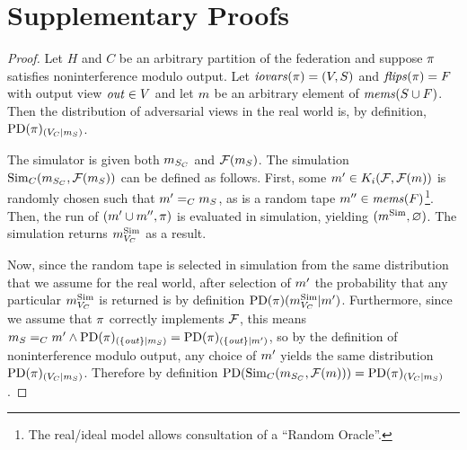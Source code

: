 \section{Supplementary Proofs}
\label{section-proofs}

\nimosecure*

\begin{proof}
  Let $H$ and $C$ be an arbitrary partition of the federation and
  suppose $\pi$ satisfies noninterference modulo output. Let
  $\mathit{iovars}(\pi) = (V,S)$ and $\mathit{flips}(\pi) = F$ with output view $\mathit{out}
  \in V$ and let $m$ be an arbitrary element of $\mathit{mems}(S \cup
  F)$. Then the distribution of adversarial views in the real world
  is, by definition,
  $\mathrm{PD}(\pi)_{({V_C}|{m_S})}$.

  The simulator is given both $m_{S_C}$ and
  $\mathcal{F}(m_S)$.  The simulation $\mathrm{Sim}_C(m_{S_C},
  \mathcal{F}(m_S))$ can be defined as follows. First, some $m'
  \in K_i(\mathcal{F},\mathcal{F}(m))$ is randomly chosen such that
  $m' =_C m_S$, as is a random tape $m'' \in
  \mathit{mems}(F)$\footnote{The real/ideal model allows consultation of a
  ``Random Oracle''.}. Then, the run of $(m' \cup m'',
  \pi)$ is evaluated in simulation, yielding $(m^{\mathrm{Sim}},\varnothing)$.
  The simulation returns $m^{\mathrm{Sim}}_{V_C}$ as a result.

  Now, since the random tape is selected in simulation from the same distribution
  that we assume for the real world, after selection of $m'$ the
  probability that any particular $m^{\mathrm{Sim}}_{V_C}$ is returned is by definition
  $
  \mathrm{PD}(\pi)(m^{\mathrm{Sim}}_{V_C} | m')
  $.
  Furthermore, since we assume that $\pi$ correctly implements $\mathcal{F}$, this
  means
  $
  m_S =_C m' \wedge
     \mathrm{PD}(\pi)_{({\{ \mathit{out} \}}|{m_S})} =
     \mathrm{PD}(\pi)_{({\{ \mathit{out} \}}|{m'})}
  $,
  so by the definition of noninterference modulo output,
  any choice of $m'$ yields the same distribution $\mathrm{PD}(\pi)_{({V_C}|{m_S})}$.
  Therefore by definition
  $
   \mathrm{PD}(\mathrm{Sim}_C(m_{S_C},\mathcal{F}(m))) = \mathrm{PD}(\pi)_{({V_C}|{m_S})}
  $.
\end{proof}

